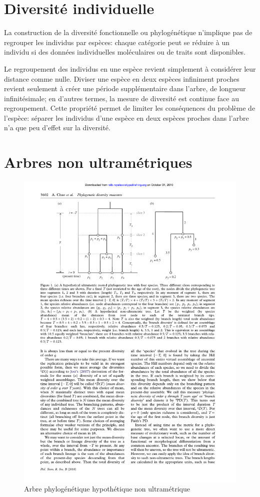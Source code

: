 \documentclass[
  11pt,
  french,
  a4paper,
  extrafontsizes,onecolumn,openright
  ]{memoir}
\begin{document}
\normalsize

\section{Diversité individuelle}\label{diversituxe9-individuelle}

La construction de la diversité fonctionnelle ou phylogénétique n'implique pas de regrouper les individus par espèces: chaque catégorie peut se réduire à un individu si des données individuelles moléculaires ou de traits sont disponibles.

Le regroupement des individus en une espèce revient simplement à considérer leur distance comme nulle.
Diviser une espèce en deux espèces infiniment proches revient seulement à créer une période supplémentaire dans l'arbre, de longueur infinitésimale; en d'autres termes, la mesure de diversité est continue face au regroupement.
Cette propriété permet de limiter les conséquences du problème de l'espèce: séparer les individus d'une espèce en deux espèces proches dans l'arbre n'a que peu d'effet sur la diversité.

\section{Arbres non ultramétriques}\label{arbres-non-ultramuxe9triques}

\scriptsize

\begin{figure}

{\centering \includegraphics[width=0.4\linewidth]{images/Chao2010} 

}

\caption{Arbre phylogénétique hypothétique non ultramétrique}\label{fig:Chao2010}
\end{figure}
\end{document}
